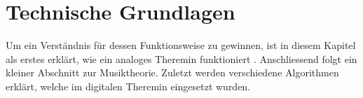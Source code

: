 \clearpage
\section{Technische Grundlagen}\label{sec:Technische Grundlagen}
Um ein Verständnis für dessen Funktionsweise zu gewinnen, ist in diesem Kapitel als erstes erklärt, wie ein analoges Theremin funktioniert . Anschliessend folgt ein kleiner Abschnitt zur Musiktheorie. Zuletzt werden verschiedene Algorithmen erklärt, welche im digitalen Theremin eingesetzt wurden.